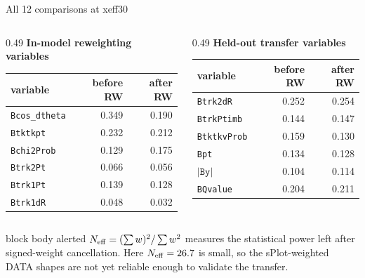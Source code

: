 \documentclass[11pt,aspectratio=169]{beamer}
\begin{document}
\begin{frame}[label=p7]{All 12 comparisons at xeff30}
  \footnotesize
  \vspace{0.15em}
  \begin{columns}[T,onlytextwidth]
    \begin{column}{0.49\textwidth}
      \centering
      \textbf{In-model reweighting variables}\\[0.15em]
      \renewcommand{\arraystretch}{1.15}
      \begin{tabular}{lrr}
        \toprule
        variable & before RW & after RW \\
        \midrule
        \texttt{Bcos\_dtheta} & 0.349 & 0.190 \\
        \texttt{Btktkpt}      & 0.232 & 0.212 \\
        \texttt{Bchi2Prob}     & 0.129 & 0.175 \\
        \texttt{Btrk2Pt}       & 0.066 & 0.056 \\
        \texttt{Btrk1Pt}       & 0.139 & 0.128 \\
        \texttt{Btrk1dR}       & 0.048 & 0.032 \\
        \bottomrule
      \end{tabular}
    \end{column}
    \begin{column}{0.49\textwidth}
      \centering
      \textbf{Held-out transfer variables}\\[0.15em]
      \renewcommand{\arraystretch}{1.15}
      \begin{tabular}{lrr}
        \toprule
        variable & before RW & after RW \\
        \midrule
        \texttt{Btrk2dR}   & 0.252 & 0.254 \\
        \texttt{BtrkPtimb}  & 0.144 & 0.147 \\
        \texttt{BtktkvProb} & 0.159 & 0.130 \\
        \texttt{Bpt}        & 0.134 & 0.128 \\
        $|\texttt{By}|$     & 0.104 & 0.114 \\
        \texttt{BQvalue}    & 0.204 & 0.211 \\
        \bottomrule
      \end{tabular}
    \end{column}
  \end{columns}

  \vfill
  \centering
  \begin{beamercolorbox}[wd=0.94\textwidth,sep=0.38em,center,rounded=true]{block body alerted}
    $N_{\rm eff}=(\sum w)^2/\sum w^2$ measures the statistical power left after signed-weight
    cancellation. Here $N_{\rm eff}=26.7$ is small, so the sPlot-weighted DATA shapes are not yet
    reliable enough to validate the transfer.
  \end{beamercolorbox}
\end{frame}
\end{document}
